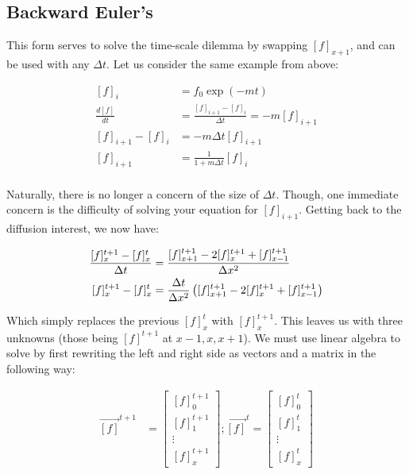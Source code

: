 \subsection{Backward Euler's} This form serves to solve the time-scale dilemma by swapping $[f]_{x+1}$, and can be used with any $\Delta t$. Let us consider the same example from above: 

\begin{equation} \label{diff5}
\begin{split}
[f]_i & = f_0\exp(-mt) \\
\frac{d[f]}{dt} & = \frac{[f]_{i+1} - [f]_{i}}{\Delta t} = -m[f]_{i+1} \\
[f]_{i+1} - [f]_{i} & = -m\Delta t[f]_{i+1} \\
[f]_{i+1} & = \frac{1}{1+m\Delta t}[f]_{i} \\
\end{split}
\end{equation}

Naturally, there is no longer a concern of the size of $\Delta t$. Though, one immediate concern is the difficulty of solving your equation for $[f]_{i+1}$. Getting back to the diffusion interest, we now have:

\begin{equation} \label{diff6}
\begin{split}
\frac{[f]^{t+1}_{x} - [f]^{t}_{x}}{\Delta t} &= \frac{[f]^{t+1}_{x+1} - 2[f]^{t+1}_x + [f]^{t+1}_{x - 1}}{\Delta x^2}\\
[f]^{t+1}_{x} - [f]^{t}_{x} &= \frac{\Delta t}{\Delta x^2} \left([f]^{t+1}_{x+1} - 2[f]^{t + 1}_x + [f]^{t + 1}_{x - 1}\right) \\
\end{split}
\end{equation}


Which simply replaces the previous $[f]^{t}_{x}$ with $[f]^{t+1}_{x}$. This leaves us with three unknowns (those being $[f]^{t+1}$ at $x-1,x,x+1$). We must use linear algebra to solve by first rewriting the left and right side as vectors and a matrix in the following way: 

\begin{align}
\vec{[f]}^{t+1} &= \begin{bmatrix}
        [f]^{t+1}_{0} \\
        [f]^{t+1}_{1} \\
        \vdots \\
        [f]^{t+1}_{x}
\end{bmatrix}
; \vec{[f]}^{t} = \begin{bmatrix}
        [f]^{t}_{0} \\
        [f]^{t}_{1} \\
        \vdots \\
        [f]^{t}_{x}
\end{bmatrix}
\end{align}

